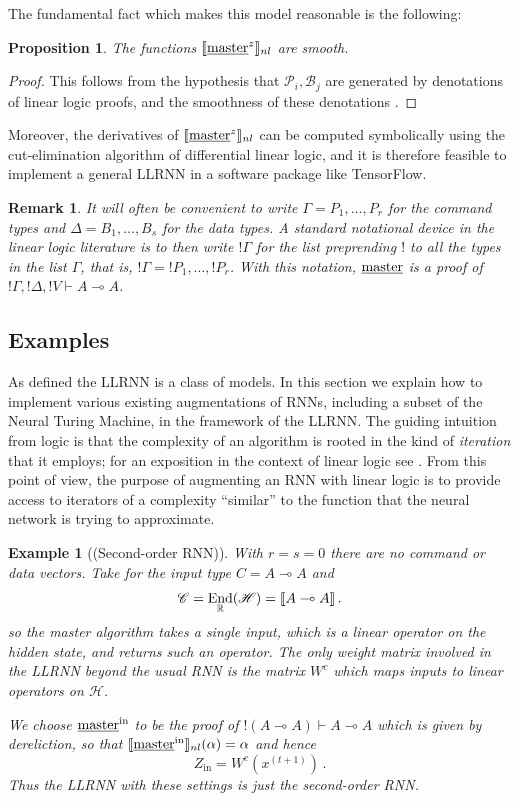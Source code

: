 \documentclass[english,letter paper,12pt,leqno]{article}
\newtheorem{proposition}[theorem]{Proposition}
\theoremstyle{example}
\newtheorem{example}[theorem]{Example}
\newtheorem{remark}[theorem]{Remark}
\numberwithin{equation}{section}
\def\be{\begin{equation}}
\def\ee{\end{equation}}
\DeclareMathOperator{\End}{End}
\begin{document}
The fundamental fact which makes this model reasonable is the following:

\begin{proposition} The functions $\llbracket \underline{\textup{master}}^z \rrbracket_{nl}$ are smooth.
\end{proposition}
\begin{proof}
This follows from the hypothesis that $\mathscr{P}_i, \mathscr{B}_j$ are generated by denotations of linear logic proofs, and the smoothness of these denotations \cite{murfetclift}.
\end{proof}

Moreover, the derivatives of $\llbracket \underline{\textup{master}}^z \rrbracket_{nl}$ can be computed symbolically using the cut-elimination algorithm of differential linear logic, and it is therefore feasible to implement a general LLRNN in a software package like TensorFlow. 

\begin{remark}\label{remark:sequentbang} It will often be convenient to write $\Gamma = P_1, \ldots, P_r$ for the command types and $\Delta = B_1, \ldots, B_s$ for the data types. A standard notational device in the linear logic literature is to then write ${!} \Gamma$ for the list preprending ${!}$ to all the types in the list $\Gamma$, that is, ${!} \Gamma = {!} P_1, \ldots, {!} P_r$. With this notation, $\underline{\textup{master}}$ is a proof of ${!} \Gamma, {!} \Delta, {!} V \vdash A \multimap A$.
\end{remark}

\subsection{Examples}

As defined the LLRNN is a class of models. In this section we explain how to implement various existing augmentations of RNNs, including a subset of the Neural Turing Machine, in the framework of the LLRNN. The guiding intuition from logic is that the complexity of an algorithm is rooted in the kind of \emph{iteration} that it employs; for an exposition in the context of linear logic see \cite[\S 7]{murfet_ll}. From this point of view, the purpose of augmenting an RNN with linear logic is to provide access to iterators of a complexity ``similar'' to the function that the neural network is trying to approximate.

\begin{example}[(Second-order RNN)] With $r = s = 0$ there are no command or data vectors. Take for the input type $C = A \multimap A$ and
\[
\mathscr{C} = \End_{\mathbb{R}}(\mathscr{H}) = \den{A \multimap A}\,.
\]
so the master algorithm takes a single input, which is a linear operator on the hidden state, and returns such an operator. The only weight matrix involved in the LLRNN beyond the usual RNN is the matrix $W^c$ which maps inputs to linear operators on $\mathscr{H}$.

We choose $\underline{\textup{master}}^{\mathrm{in}}$ to be the proof of ${!}(A \multimap A) \vdash A \multimap A$ which is given by dereliction, so that $\llbracket \underline{\textup{master}}^{\mathrm{in}} \rrbracket_{nl}(\alpha) = \alpha$ and hence
\be\label{eq:secondorderRNNinLLRNN}
Z_{\mathrm{in}} = W^c(x^{(t+1)})\,.
\ee
Thus the LLRNN with these settings is just the second-order RNN.
\end{example}
\end{document}
